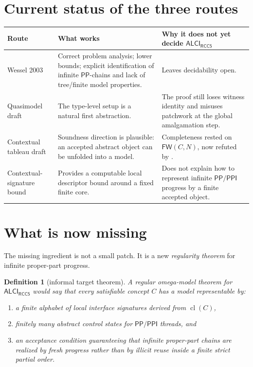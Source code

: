 \documentclass[11pt]{article}
\newtheorem{definition}[proposition]{Definition}
\newcommand{\ALCIRCC}{\mathsf{ALCI}_{\mathsf{RCC5}}}
\newcommand{\Pp}{\mathsf{PP}}
\newcommand{\Ppi}{\mathsf{PPI}}
\newcommand{\FW}{\mathsf{FW}}
\newcommand{\cl}{\operatorname{cl}}
\begin{document}
\section{Current status of the three routes}

\begin{center}
\renewcommand{\arraystretch}{1.25}
\begin{tabularx}{\textwidth}{@{}>{\raggedright\arraybackslash}p{}>{\raggedright\arraybackslash}p{}>{\raggedright\arraybackslash}X@{}}
\toprule
\textbf{Route} & \textbf{What works} & \textbf{Why it does not yet decide $\ALCIRCC$} \\
\midrule
Wessel 2003 \cite{Wessel2003} & Correct problem analysis; lower bounds; explicit identification of infinite $\Pp$-chains and lack of tree/finite model properties. & Leaves decidability open. \\
\addlinespace
Quasimodel draft \cite{Claude2026Quasi} & The type-level setup is a natural first abstraction. & The proof still loses witness identity and misuses patchwork at the global amalgamation step. \\
\addlinespace
Contextual tableau draft \cite{GPT2026Tableau} & Soundness direction is plausible: an accepted abstract object can be unfolded into a model. & Completeness rested on $\FW(C,N)$, now refuted by \cite{Claude2026FW}. \\
\addlinespace
Contextual-signature bound \cite{GPT2026Bound} & Provides a computable local descriptor bound around a fixed finite core. & Does not explain how to represent infinite $\Pp/\Ppi$ progress by a finite accepted object. \\
\bottomrule
\end{tabularx}
\end{center}

\section{What is now missing}

The missing ingredient is not a small patch. It is a new \emph{regularity theorem} for infinite proper-part progress.

\begin{definition}[informal target theorem]
A \emph{regular omega-model theorem} for $\ALCIRCC$ would say that every satisfiable concept $C$ has a model representable by:
\begin{enumerate}
\item a finite alphabet of local interface signatures derived from $\cl(C)$,
\item finitely many abstract control states for $\Pp/\Ppi$ threads, and
\item an acceptance condition guaranteeing that infinite proper-part chains are realized by fresh progress rather than by illicit reuse inside a finite strict partial order.
\end{enumerate}
\end{definition}
\end{document}
